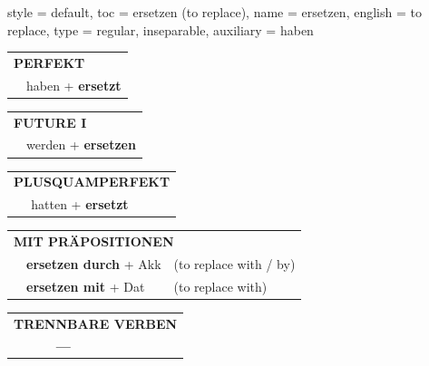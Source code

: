 \begin{verbentry}{
  style = {default},
  toc = {ersetzen (to replace)},
  name = {ersetzen},
  english = {to replace},
  type = {regular, inseparable},
  auxiliary = {haben}
}
 \begin{tabular}{rl}
     \multicolumn{2}{l}{\textbf{PERFEKT}}\\
   & haben + \textbf{ersetzt}\\
  \end{tabular}
\hfill
   \begin{tabular}{rl}
    \multicolumn{2}{l}{\textbf{FUTURE I} }\\
   & werden + \textbf{ersetzen}\\
  \end{tabular}
\hfill
   \begin{tabular}{rl}
      \multicolumn{2}{l}{\textbf{PLUSQUAMPERFEKT}}\\
   & hatten + \textbf{ersetzt}\\
  \end{tabular}

   \vspace{10pt}

   \begin{tabular}{lll}
      \multicolumn{3}{l}{\textbf{MIT PRÄPOSITIONEN}}\\
& \textbf{ersetzen durch} + Akk & (to replace with / by)\\
& \textbf{ersetzen mit} + Dat & (to replace with)\\
\end{tabular}
  \hfill
   \begin{tabular}{lll}
\multicolumn{3}{l}{\textbf{TRENNBARE VERBEN}}\\
& \textbf{---} & \\
\end{tabular}

  \vspace{-5pt}
\end{verbentry}

